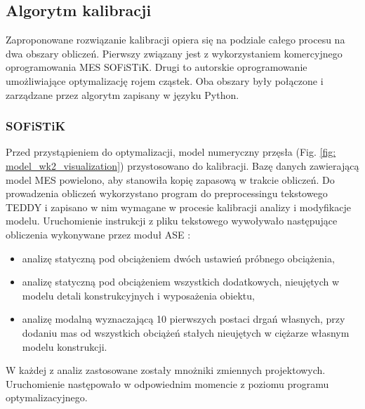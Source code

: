 \begin{table}[h]
	
	\caption{Zakresy dopuszczalnych zmian mass konstrukcyjnych i niekonstrukcyjnych}
	\centering
	\label{tab:calibration_mass}
\end{table}
\subsection{Algorytm kalibracji}
Zaproponowane rozwiązanie kalibracji opiera się na podziale całego procesu na dwa obszary obliczeń. Pierwszy związany jest z wykorzystaniem komercyjnego oprogramowania MES SOFiSTiK. Drugi to autorskie oprogramowanie umożliwiające optymalizację rojem cząstek. Oba obszary były połączone i zarządzane przez algorytm zapisany w języku Python.

\subsubsection{SOFiSTiK}
Przed przystąpieniem do optymalizacji, model numeryczny przęsła (Fig. \ref{fig: model_wk2_visualization}) przystosowano do kalibracji. Bazę danych zawierającą model MES powielono, aby stanowiła kopię zapasową w trakcie obliczeń. Do prowadzenia obliczeń wykorzystano program do preprocessingu tekstowego TEDDY i zapisano w nim wymagane w procesie kalibracji analizy i modyfikacje modelu. Uruchomienie instrukcji z pliku tekstowego wywoływało następujące obliczenia wykonywane przez moduł ASE \parencite{AG2018}:
\begin{itemize}
	\item analizę statyczną pod obciążeniem dwóch ustawień próbnego obciążenia,
	\item analizę statyczną pod obciążeniem wszystkich dodatkowych, nieujętych w modelu detali konstrukcyjnych i wyposażenia obiektu,
	\item analizę modalną wyznaczającą 10 pierwszych postaci drgań własnych, przy dodaniu mas od wszystkich obciążeń stałych nieujętych w ciężarze własnym modelu konstrukcji.
\end{itemize}
W każdej z analiz zastosowane zostały mnożniki zmiennych projektowych. Uruchomienie następowało w odpowiednim momencie z poziomu programu optymalizacyjnego.

